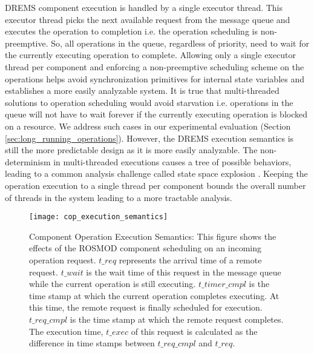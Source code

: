 DREMS component execution is handled by a single executor thread. This executor thread picks the next available request from the message queue and executes the operation to completion i.e. the operation scheduling is non-preemptive. So, all operations in the queue, regardless of priority, need to wait for the currently executing operation to complete. Allowing only a single executor thread per component and enforcing a non-preemptive scheduling scheme on the operations helps avoid synchronization primitives for internal state variables and establishes a more easily analyzable system. It is true that multi-threaded solutions to operation scheduling would avoid starvation i.e. operations in the queue will not have to wait forever if the currently executing operation is blocked on a resource. We address such cases in our experimental evaluation (Section \ref{sec:long_running_operations}). However, the DREMS execution semantics is still the more predictable design as it is more easily analyzable. The non-determinism in multi-threaded executions causes a tree of possible behaviors, leading to a common analysis challenge called state space explosion \cite{lin1987protocol}. Keeping the operation execution to a single thread per component bounds the overall number of threads in the system leading to a more tractable analysis. 

\begin{figure}[ht]
	\centering
	\texttt{[image: cop\_execution\_semantics]}
	\caption{Component Operation Execution Semantics: This figure shows the effects of the ROSMOD component scheduling on an incoming operation request. $t\_{req}$ represents the arrival time of a remote request. $t\_{wait}$ is the wait time of this request in the message queue while the current operation is still executing. $t\_{timer\_cmpl}$ is the time stamp at which the current operation completes executing. At this time, the remote request is finally scheduled for execution. $t\_{req\_cmpl}$ is the time stamp at which the remote request completes. The execution time, $t\_{exec}$ of this request is calculated as the difference in time stamps between $t\_{req\_cmpl}$ and $t\_{req}$.}
	\label{fig:cop_execution_semantics}
\end{figure}

